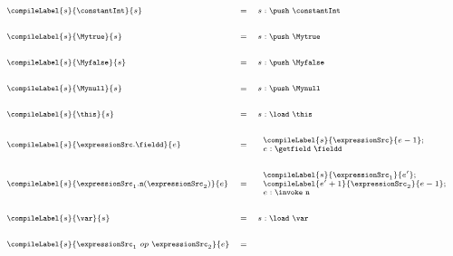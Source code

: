 \begin{figure}[ht!]
\begin{frameit}
$${\scriptsize 
        \begin{array}{lll} 
	\compileLabel{s}{\constantInt}{s} &  =  & s : \push \  \constantInt \\
	& & \\ & & \\
	\compileLabel{s}{\Mytrue}{s} & = &  s: \push  \  \Mytrue \\
	& & \\ & & \\
	\compileLabel{s}{\Myfalse}{s} & = &  s: \push \ \Myfalse \\
	& & \\ & & \\
	\compileLabel{s}{\Mynull }{s } & = &  s: \push \ \Mynull\\
	& & \\ & & \\
	\compileLabel{s}{\this}{s } & = &  s:  \load \ \this \\
	& & \\ & & \\ 
	\compileLabel{s}{ \expressionSrc.\fieldd}{e} & = &    
         \begin{array}{l}
              \compileLabel{s}{\expressionSrc}{e - 1}; \\ 
              e : \getfield  \ \fieldd
           \end{array} \\
	& & \\ & & \\ 
	\compileLabel{s}{\expressionSrc_1.\mbox{\rm \texttt{n}} (\expressionSrc_2)}{e} & = &  
	   \begin{array}{l}  
                 \compileLabel{s}{\expressionSrc_1}{e'};\\
		 \compileLabel{e' + 1}{\expressionSrc_2}{e - 1};\\
		  e  :\invoke \ \mbox{\rm \texttt{n}} 
            \end{array}  \\
	& & \\ & & \\
	\compileLabel{s}{ \var }{s} & = &   s: \load \ \var \\ %
	& & \\ & & \\
	\compileLabel{s}{ \expressionSrc_1 \ op \ \expressionSrc_2 }{e} & = &  
                 \begin{array}{l}

\end{array}
\end{array}}$$
\end{frameit}
\end{figure}
